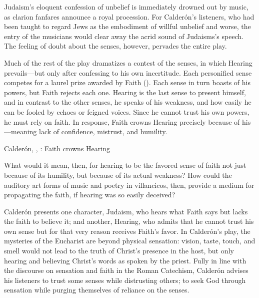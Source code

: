 Judaism's eloquent confession of unbelief is immediately drowned out by music, as clarion fanfares announce a royal procession.
For Calderón's listeners, who had been taught to regard Jews as the embodiment of willful unbelief and worse, the entry of the musicians would clear away the acrid sound of Judaisms's speech.
The feeling of doubt about the senses, however, pervades the entire play.

Much of the rest of the play dramatizes a contest of the senses, in which Hearing prevails---but only after confessing to his own incertitude.
Each personified sense competes for a laurel prize awarded by Faith ().
Each sense in turn boasts of his powers, but Faith rejects each one.
Hearing is the last sense to present himself, and in contrast to the other senses, he speaks of his weakness, and how easily he can be fooled by echoes or feigned voices.
Since he cannot trust his own powers, he must rely on faith.
In response, Faith crowns Hearing precisely because of his ---meaning lack of confidence, mistrust, and humility.

\begin{expoem}
    \caption{Calderón, , : Faith crowns Hearing}
    \label{expoem:Calderon-Retiro-Hearing}
\end{expoem}

What would it mean, then, for hearing to be the favored sense of faith not just because of its humility, but because of its actual weakness?
How could the auditory art forms of music and poetry in villancicos, then, provide a medium for propagating the faith, if hearing was so easily deceived?


Calderón presents one character, Judaism, who hears what Faith says but lacks the faith to believe it; and another, Hearing, who admits that he cannot trust his own sense but for that very reason receives Faith's favor.
In Calderón's play, the mysteries of the Eucharist are beyond physical sensation: vision, taste, touch, and smell would not lead to the truth of Christ's presence in the host, but only hearing and believing Christ's words  as spoken by the priest.
Fully in line with the discourse on sensation and faith in the Roman Catechism, Calderón advises his listeners to trust some senses while distrusting others; to seek God through sensation while purging themselves of reliance on the senses.

